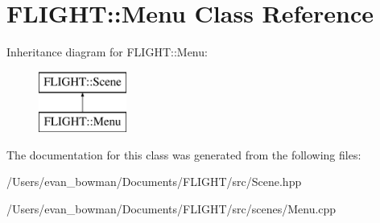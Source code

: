\hypertarget{class_f_l_i_g_h_t_1_1_menu}{}\section{F\+L\+I\+G\+HT\+:\+:Menu Class Reference}
\label{class_f_l_i_g_h_t_1_1_menu}
Inheritance diagram for F\+L\+I\+G\+HT\+:\+:Menu\+:\begin{figure}[H]
\begin{center}
\leavevmode
\includegraphics[height=2.000000cm]{class_f_l_i_g_h_t_1_1_menu}
\end{center}
\end{figure}


The documentation for this class was generated from the following files\+:\begin{DoxyCompactItemize}
\item 
/\+Users/evan\+\_\+bowman/\+Documents/\+F\+L\+I\+G\+H\+T/src/Scene.\+hpp\item 
/\+Users/evan\+\_\+bowman/\+Documents/\+F\+L\+I\+G\+H\+T/src/scenes/Menu.\+cpp\end{DoxyCompactItemize}
